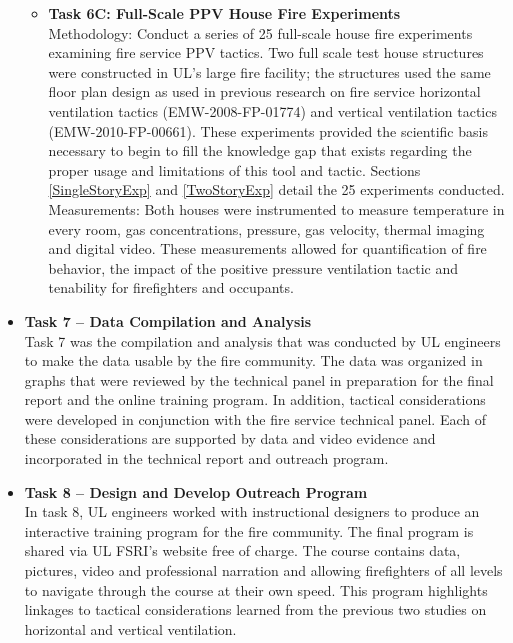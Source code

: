 \documentclass{article}
\begin{document}
\begin{itemize}
\begin{itemize}
		\item \textbf{Task 6C: Full-Scale PPV House Fire Experiments} \\
		Methodology: Conduct a series of 25 full-scale house fire experiments examining fire service PPV tactics. Two full scale test house structures were constructed in UL’s large fire facility; the structures used the same floor plan design as used in previous research on fire service horizontal ventilation tactics (EMW-2008-FP-01774)\cite{DHS2008} and vertical ventilation tactics (EMW-2010-FP-00661)\cite{DHS2010}. These experiments provided the scientific basis necessary to begin to fill the knowledge gap that exists regarding the proper usage and limitations of this tool and tactic. Sections \ref{SingleStoryExp} and \ref{TwoStoryExp} detail the 25 experiments conducted.
		\vspace*{\baselineskip}
		Measurements: Both houses were instrumented to measure temperature in every room, gas concentrations, pressure, gas velocity, thermal imaging and digital video. These measurements allowed for quantification of fire behavior, the impact of the positive pressure ventilation tactic and tenability for firefighters and occupants.
	\end{itemize}
	\item \textbf{Task 7 – Data Compilation and Analysis} \\
	Task 7 was the compilation and analysis that was conducted by UL engineers to make the data usable by the fire community. The data was organized in graphs that were reviewed by the technical panel in preparation for the final report and the online training program. In addition, tactical considerations were developed in conjunction with the fire service technical panel. Each of these considerations are supported by data and video evidence and incorporated in the technical report and outreach program.
	
	\item \textbf{Task 8 – Design and Develop Outreach Program} \\
	In task 8, UL engineers worked with instructional designers to produce an interactive training program for the fire community. The final program is shared via UL FSRI's website free of charge.  The course contains data, pictures, video and professional narration and allowing firefighters of all levels to navigate through the course at their own speed. This program highlights linkages to tactical considerations learned from the previous two studies on horizontal and vertical ventilation.
	

\end{itemize}
\end{document}
